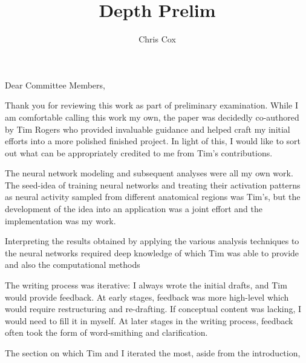 \documentclass[11pt,letterpaper]{letter}
\author{Chris Cox}
\title{Depth Prelim}
\begin{document}
Dear Committee Members,

Thank you for reviewing this work as part of preliminary examination. While I am comfortable calling this work my own, the paper was decidedly co-authored by Tim Rogers who provided invaluable guidance and helped craft my initial efforts into a more polished finished project. In light of this, I would like to sort out what can be appropriately credited to me from Tim's contributions.

The neural network modeling and subsequent analyses were all my own work.  The seed-idea of training neural networks and treating their activation patterns as neural activity sampled from different anatomical regions was Tim's, but the development of the idea into an application was a joint effort and the implementation was my work.

Interpreting the results obtained by applying the various analysis techniques to the neural networks required deep knowledge of which Tim was able to provide and also the computational methods 

The writing process was iterative: I always wrote the initial drafts, and Tim would provide feedback. At early stages, feedback was more high-level which would require restructuring and re-drafting. If conceptual content was lacking, I would need to fill it in myself. At later stages in the writing process, feedback often took the form of word-smithing and clarification.

The section on which Tim and I iterated the most, aside from the introduction, 
\end{document}
